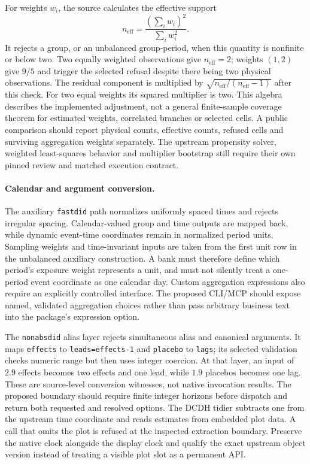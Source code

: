 For weights $w_i$, the source calculates the effective support
\[
 n_{\mathrm{eff}}=\frac{(\sum_i w_i)^2}{\sum_i w_i^2}.
\]
It rejects a group, or an unbalanced group-period, when this quantity is
nonfinite or below two. Two equally weighted observations give
$n_{\mathrm{eff}}=2$; weights $(1,2)$ give $9/5$ and trigger the selected
refusal despite there being two physical observations. The residual component
is multiplied by $\sqrt{n_{\mathrm{eff}}/(n_{\mathrm{eff}}-1)}$ after this
check. For two equal weights its squared multiplier is two. This algebra
describes the implemented adjustment, not a general finite-sample coverage
theorem for estimated weights, correlated branches or selected cells. A public
comparison should report physical counts, effective counts, refused cells and
surviving aggregation weights separately. The upstream propensity solver,
weighted least-squares behavior and multiplier bootstrap still require their
own pinned review and matched execution contract.

\paragraph{Calendar and argument conversion.}
The auxiliary \texttt{fastdid} path normalizes uniformly spaced times and
rejects irregular spacing. Calendar-valued group and time outputs are mapped
back, while dynamic event-time coordinates remain in normalized period units.
Sampling weights and time-invariant inputs are taken from the first unit row
in the unbalanced auxiliary construction. A bank must therefore define which
period's exposure weight represents a unit, and must not silently treat a
one-period event coordinate as one calendar day. Custom aggregation expressions
also require an explicitly controlled interface. The proposed CLI/MCP should
expose named, validated aggregation choices rather than pass arbitrary business
text into the package's expression option.

The \texttt{nonabsdid} alias layer rejects simultaneous alias and canonical
arguments. It maps \texttt{effects} to \texttt{leads=effects-1} and
\texttt{placebo} to \texttt{lags}; its selected validation checks numeric range
but then uses integer coercion. At that layer, an input of $2.9$ effects becomes
two effects and one lead, while $1.9$ placebos becomes one lag. These are
source-level conversion witnesses, not native invocation results. The proposed
boundary should require finite integer horizons before dispatch and return
both requested and resolved options. The DCDH tidier subtracts one from the
upstream time coordinate and reads estimates from embedded plot data. A call
that omits the plot is refused at the inspected extraction boundary. Preserve
the native clock alongside the display clock and qualify the exact upstream
object version instead of treating a visible plot slot as a permanent API.

